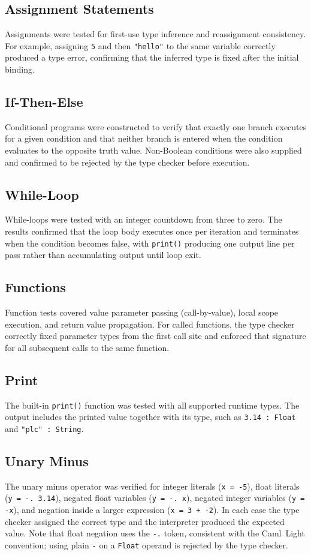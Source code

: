 \subsection{Assignment Statements}
Assignments were tested for first-use type inference and reassignment
consistency. For example, assigning \texttt{5} and then \texttt{"hello"} to
the same variable correctly produced a type error, confirming that the inferred
type is fixed after the initial binding.

\subsection{If-Then-Else}
Conditional programs were constructed to verify that exactly one branch
executes for a given condition and that neither branch is entered when the
condition evaluates to the opposite truth value. Non-Boolean conditions were
also supplied and confirmed to be rejected by the type checker before
execution.

\subsection{While-Loop}
While-loops were tested with an integer countdown from three to zero. The
results confirmed that the loop body executes once per iteration and
terminates when the condition becomes false, with \texttt{print()} producing
one output line per pass rather than accumulating output until loop exit.

\subsection{Functions}
Function tests covered value parameter passing (call-by-value), local scope
execution, and return value propagation. For called functions, the type
checker correctly fixed parameter types from the first call site and enforced
that signature for all subsequent calls to the same function.

\subsection{Print}
The built-in \texttt{print()} function was tested with all supported runtime
types. The output includes the printed value together with its type, such as
\texttt{3.14 : Float} and \texttt{"plc" : String}.

\subsection{Unary Minus}
The unary minus operator was verified for integer literals (\texttt{x = -5}),
float literals (\texttt{y = -. 3.14}), negated float variables
(\texttt{y = -. x}), negated integer variables (\texttt{y = -x}), and
negation inside a larger expression (\texttt{x = 3 + -2}). In each case the
type checker assigned the correct type and the interpreter produced the
expected value. Note that float negation uses the \texttt{-.} token, consistent
with the Caml~Light convention; using plain \texttt{-} on a \texttt{Float}
operand is rejected by the type checker.

